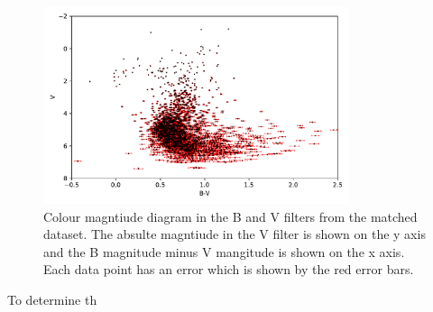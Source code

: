 \documentclass[11pt]{article}
\begin{document}
\begin{figure}
	\centering
	\includegraphics[width=0.8\textwidth]{../Figures/errobar}
	\caption{Colour magntiude diagram in the B and V filters from the matched dataset. The absulte magntiude in the V filter is shown on the y axis and the B magnitude minus V mangitude is shown on the x axis. Each data point has an error which is shown by the red error bars.}
	\label{fig:origin}
\end{figure}

To determine th
\end{document}
